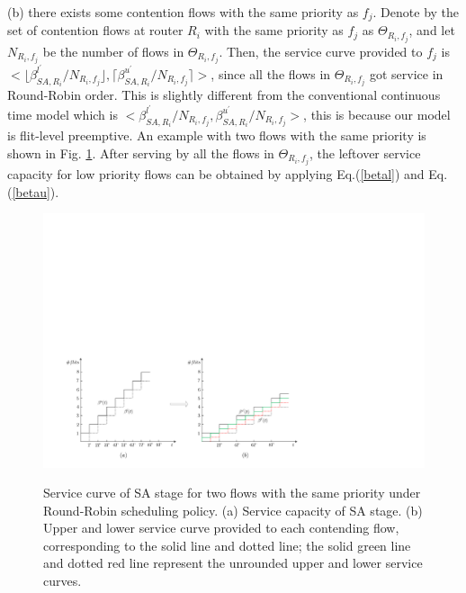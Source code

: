 \documentclass[10pt,journal]{IEEEtran}
\begin{document}
(b) there exists some contention flows with the same priority as $f_j$. Denote by the set of contention flows at router $R_i$ with the same priority as $f_j$ as $\Theta_{R_i,f_j}$, and let $N_{R_i,f_j}$ be the number of flows in $\Theta_{R_i,f_j}$. Then, the service curve provided to $f_j$ is $<\lfloor\beta^{l^\prime}_{SA,R_i}/N_{R_i,f_j}\rfloor,\lceil\beta^{u^\prime}_{SA,R_i}/N_{R_i,f_j}\rceil>$, since all the flows in $\Theta_{R_i,f_j}$ got service in Round-Robin order. This is slightly different from the conventional continuous time model which is $<\beta^{l^\prime}_{SA,R_i}/N_{R_i,f_j},\beta^{u^\prime}_{SA,R_i}/N_{R_i,f_j}>$, this is because our model is flit-level preemptive. An example with two flows with the same priority is shown in Fig. \ref{roundrobin}. After serving by all the flows in $\Theta_{R_i,f_j}$, the leftover service capacity for low priority flows can be obtained by applying Eq.(\ref{betal}) and Eq.(\ref{betau}).
\begin{figure}
  \centering
  \includegraphics[scale=0.5]{figures/RoundRobin.pdf}\\
  \caption{Service curve of SA stage for two flows with the same priority under Round-Robin scheduling policy. (a) Service capacity of SA stage. (b) Upper and lower service curve provided to each contending flow, corresponding to the solid line and dotted line; the solid green line and dotted red line represent the unrounded upper and lower service curves.}\label{roundrobin}
\end{figure}
\end{document}
